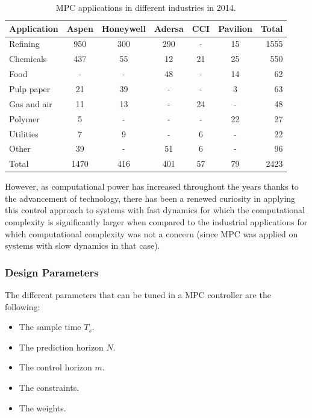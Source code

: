 \documentclass{thesisreport}
\begin{document}
\newpage

\begin{table}[h]
\setlength{\tabcolsep}{15pt} %
\renewcommand{\arraystretch}{1} %
 \caption{MPC applications in different industries in 2014.\cite{Kozak2014}}
 \label{table_MPC}
\begin{tabular}{l c c c c c r}
Application & Aspen & Honeywell & Adersa & CCI & Pavilion & Total \\
\hline
Refining & 950 & 300 & 290 & - & 15 & 1555 \\
Chemicals & 437 & 55 & 12 & 21 & 25 & 550 \\
Food & - & - & 48 & - & 14 & 62 \\
Pulp paper & 21 & 39 & - & - & 3 & 63 \\
Gas and air & 11 & 13 & - & 24 & - & 48 \\
Polymer & 5 & - & - & - & 22 & 27 \\
Utilities & 7 & 9 & - & 6 & - & 22 \\
Other & 39 & - & 51 & 6 & - & 96 \\
\hline 
\hline
Total & 1470 & 416 & 401 & 57 & 79 & 2423 \\
\end{tabular}
\end{table}

\noindent However, as computational power has increased throughout the years thanks to the advancement of technology, there has been a renewed curiosity in applying this control approach to systems with fast dynamics for which the computational complexity is significantly larger when compared to the industrial applications for which computational complexity was not a concern (since MPC was applied on systems with slow dynamics in that case).
 
\subsubsection{Design Parameters}
The different parameters that can be tuned in a MPC controller are the following:

\begin{itemize}
	\item The sample time $T_s$.
	\item The prediction horizon $N$.
	\item The control horizon $m$.
	\item The constraints.
	\item The weights.
\end{itemize}
\end{document}
